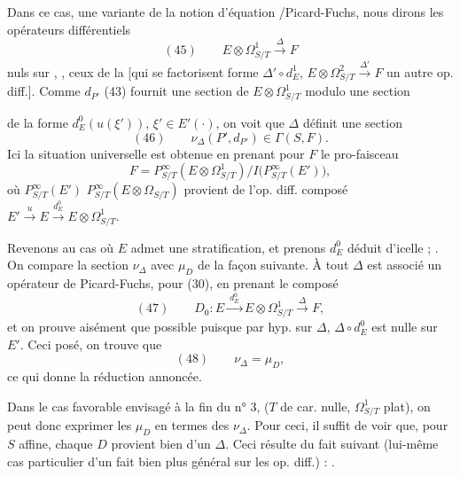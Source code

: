 \documentclass[11pt,a4paper]{article}
\begin{document}
Dans ce cas,  une variante de la
notion d'équation /Picard-Fuchs,  \struck{\ill{}} nous dirons les
opérateurs différentiels
\[
(45)\qquad E \otimes \Omega^1_{S/T} \xrightarrow{\ \Delta\ } F
\]
nuls sur , 
, ceux de la
[qui se factorisent \struck{\ill{}}   
forme $\Delta' \circ d^1_E$,  $E \otimes \Omega^2_{S/T} \xrightarrow{\Delta'} F$ un
autre op. diff.]. Comme $d_{P'}$ (43) fournit
 une section de $E \otimes \Omega^1_{S/T}$ modulo une section

de la forme $d^0_E(u(\xi'))$, $\xi' \in E'(\cdot)$, on voit que
$\Delta$ définit une section
\[
(46)\qquad \nu_\Delta(P', d_{P'}) \in \Gamma(S,F) .
\]
Ici la situation universelle est obtenue en
prenant pour $F$ le pro-faisceau
\[
F = P^\infty_{S/T}(E \otimes \Omega^1_{S/T})/I\bigl(P^\infty_{S/T}(E')\bigr) ,
\]
où $P^\infty_{S/T}(E')$   $P^\infty_{S/T}(E \otimes \Omega_{S/T})$ provient de l'op.
diff. composé   $E' \xrightarrow{u} E \xrightarrow{d^0_E} E \otimes \Omega^1_{S/T}$.

Revenons au cas où $E$ admet une stratification, \struck{\ill{}} 
 
et prenons $d^0_E$ déduit d'icelle ; \struck{\ill{}} \struck{\ill{}}
  . On compare la
section $\nu_\Delta$ avec $\mu_D$ de la façon suivante.
À tout $\Delta$ \struck{$\ldots$} est associé un opérateur de Picard-Fuchs,
\struck{\ill{}} pour (30), en prenant le composé
\[
(47)\qquad D_0 : E \xrightarrow{\ d^0_E\ } E \otimes \Omega^1_{S/T} \xrightarrow{\ \Delta\ } F ,
\]
et on prouve aisément que  \struck{\ill{}} 
possible puisque par hyp. sur $\Delta$, $\Delta \circ d^0_E$ est nulle
sur $E'$. Ceci posé, on trouve que
\[
(48)\qquad \nu_\Delta = \mu_D ,
\]
ce qui donne la réduction annoncée.

Dans le cas favorable envisagé à la fin du n° 3,
($T$ de car. nulle, $\Omega^1_{S/T}$ plat), on peut donc
exprimer les $\mu_D$ en termes des $\nu_\Delta$. Pour
ceci, il suffit de voir que, pour $S$ affine, chaque
$D$ provient bien d'un $\Delta$. Ceci résulte du
fait suivant (lui-même cas particulier d'un fait
bien plus général sur les op. diff.) : \struck{\ill{}}.
\end{document}
